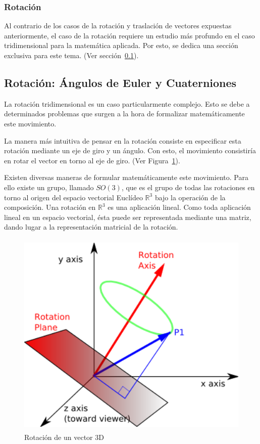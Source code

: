 \subsubsection{Rotación}
\label{makereference5.4.1.3}

Al contrario de los casos de la rotación y traslación de vectores expuestas
anteriormente, el caso de la rotación requiere un estudio más profundo en el
caso tridimensional para la matemática aplicada. Por esto, se dedica una sección
exclusiva para este tema. (Ver sección~\ref{makereference5.4.2}).

\subsection{Rotación: Ángulos de Euler y Cuaterniones}
\label{makereference5.4.2}

La rotación tridimensional es un caso particularmente complejo. Esto se debe a
determinados problemas que surgen a la hora de formalizar matemáticamente este
movimiento. 

La manera más intuitiva de pensar en la rotación consiste en especificar esta
rotación mediante un eje de giro y un ángulo. Con esto, el movimiento
consistiría en rotar el vector en torno al eje de giro. (Ver
Figura~\ref{fig:rotacion}). 

Existen diversas maneras de formular matemáticamente este movimiento. Para ello
existe un grupo, llamado $SO(3)$, que es el grupo de todas las rotaciones en
torno al origen del espacio vectorial Euclídeo $\mathbb{R}^3$ bajo la operación
de la composición. Una rotación en $\mathbb{R}^3$ es una aplicación lineal. Como
toda aplicación lineal en un espacio vectorial, ésta puede ser representada
mediante una matriz, dando lugar a la representación matricial de la rotación.

\begin{figure}
	\centering		
	\includegraphics[height=10cm]{figures/rotation.png}
	\caption{Rotación de un vector 3D}
	\label{fig:rotacion}
\end{figure}

